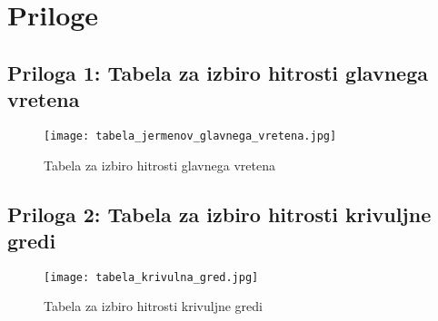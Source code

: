 \newpage

\section{Priloge}

    \subsection{Priloga 1: Tabela za izbiro hitrosti glavnega vretena}
    \label{tabela_za_izbiro_hitrosti}
    \begin{figure}[H]
        \begin{center}
            \texttt{[image: tabela\_jermenov\_glavnega\_vretena.jpg]}
            \caption{Tabela za izbiro hitrosti glavnega vretena
            \cite{gauthier}}
        \end{center}
    \end{figure}

    \subsection{Priloga 2: Tabela za izbiro hitrosti krivuljne gredi}
    \label{tabela_krivuljna_gred}
    \begin{figure}[H]
        \begin{center}
            \texttt{[image: tabela\_krivulna\_gred.jpg]}
            \caption{Tabela za izbiro hitrosti krivuljne gredi
            \cite{gauthier}}
        \end{center}
    \end{figure}
